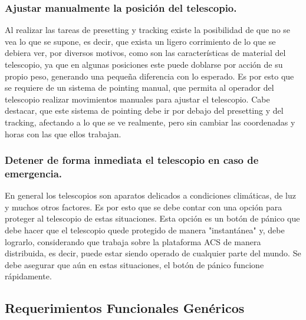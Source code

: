 \documentclass[letterpaper,spanish,10pt]{article}
\begin{document}
\subsubsection{Ajustar manualmente la posici\'on del telescopio.}
Al realizar las tareas de presetting y tracking existe la posibilidad de que no se vea lo que se supone, es decir, que exista un ligero corrimiento de lo que se debiera ver, por diversos motivos, como son las características de material del telescopio, ya que en algunas posiciones este puede doblarse por acción de su propio peso, generando una pequeña diferencia con lo esperado. Es por esto que se requiere de un sistema de pointing manual, que permita al operador del telescopio realizar movimientos manuales para ajustar el telescopio. Cabe destacar, que este sistema de pointing debe ir por debajo del presetting y del tracking, afectando a lo que se ve realmente, pero sin cambiar las coordenadas y horas con las que ellos trabajan.


\subsubsection{Detener de forma inmediata el telescopio en caso de emergencia.}
En general los telescopios son aparatos delicados a condiciones climáticas, de luz y muchos otros factores. Es por esto que se debe contar con una opción para proteger al telescopio de estas situaciones. Esta opción es un botón de pánico que debe hacer que el telescopio quede protegido de manera "instantánea" y, debe lograrlo, considerando que trabaja sobre la plataforma ACS de manera distribuida, es decir, puede estar siendo operado de cualquier parte del mundo. Se debe asegurar que aún en estas situaciones, el botón de pánico funcione rápidamente.



\subsection{Requerimientos Funcionales Gen\'ericos}
\end{document}
